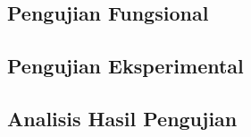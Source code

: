 \subsection{Pengujian Fungsional}
\label{subsec:0502-pengujian-fungsional}



\subsection{Pengujian Eksperimental}
\label{subsec:0502-pengujian-eksperimental}



\subsection{Analisis Hasil Pengujian}
\label{subsec:0502-analisis-hasil-pengujian}
